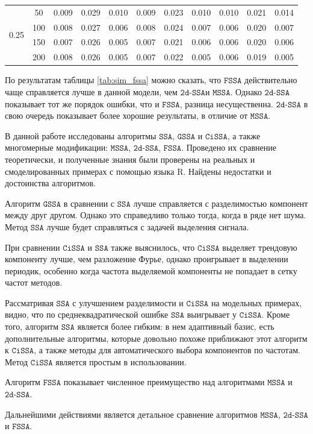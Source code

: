 \documentclass[12pt, specialist, subf
]{disser}
\theoremstyle{definition}
\newcommand{\SSA}{\texttt{SSA}}
\newcommand{\GSSA}{\texttt{GSSA}}
\newcommand{\CISSA}{\texttt{CiSSA}}
\newcommand{\MSSA}{\texttt{MSSA}}
\newcommand{\FSSA}{\texttt{FSSA}}
\newcommand{\DSSA}{\texttt{2d-SSA}}
\begin{document}
\begin{table}[H]
\begin{tabular}{c|c|ccc|ccc|ccc}
		\midrule
		\multirow{4}{*}{0.25}         & 50                       & 0.009                       & 0.029                       & 0.010                      & 0.009  & 0.023 & 0.010 & 0.010  & 0.021 & 0.014 \\
		                              & 100                      & 0.008                       & 0.027                       & 0.006                      & 0.008  & 0.024 & 0.007 & 0.006  & 0.020 & 0.007 \\
		                              & 150                      & 0.007                       & 0.026                       & 0.005                      & 0.007  & 0.021 & 0.006 & 0.006  & 0.020 & 0.006 \\
		                              & 200                      & 0.008                       & 0.026                       & 0.005                      & 0.007  & 0.022 & 0.005 & 0.006  & 0.019 & 0.005 \\
		\bottomrule
	\end{tabular}
\end{table}


По результатам таблицы \ref{tab:sim_fssa} можно сказать, что $\FSSA$ действительно чаще справляется лучше в данной модели, чем $\DSSA$и $\MSSA$. Однако $\DSSA$ показывает тот же порядок ошибки, что и $\FSSA$, разница несущественна. $\DSSA$ в свою очередь показывает более хорошие результаты, в отличие от $\MSSA$.


\newpage






\conclusion
\label{sec:concl}


В данной работе исследованы алгоритмы $\SSA$, $\GSSA$ и $\CISSA$, а также многомерные модификации: $\MSSA$, $\DSSA$, $\FSSA$. Проведено их сравнение теоретически, и полученные
знания были проверены на реальных и смоделированных примерах с помощью языка R. Найдены недостатки и достоинства алгоритмов.

Алгоритм $\GSSA$ в сравнении с $\SSA$ лучше справляется с разделимостью  компонент между друг другом. Однако это справедливо только тогда, когда в ряде нет шума. Метод $\SSA$ лучше будет справляться с задачей выделения сигнала.

При сравнении $\CISSA$ и $\SSA$ также выяснилось, что $\CISSA$ выделяет трендовую компоненту лучше, чем разложение Фурье, однако проигрывает в выделении периодик, особенно когда частота выделяемой компоненты не попадает в сетку частот методов.

Рассматривая $\SSA$ с улучшением разделимости и $\CISSA$ на модельных примерах, видно, что по среднеквадратической ошибке $\SSA$ выигрывает у $\CISSA$.
Кроме того, алгоритм $\SSA$ является более гибким: в нем адаптивный базис, есть дополнительные алгоритмы, которые довольно похоже приближают этот алгоритм к $\CISSA$, а также методы для автоматического выбора компонентов по частотам. Метод $\CISSA$ является простым в использовании.

Алгоритм $\FSSA$ показывает численное преимущество над алгоритмами $\MSSA$ и $\DSSA$.


Дальнейшими действиями является детальное сравнение алгоритмов $\MSSA$, $\DSSA$ и $\FSSA$.


\newpage



\end{document}
